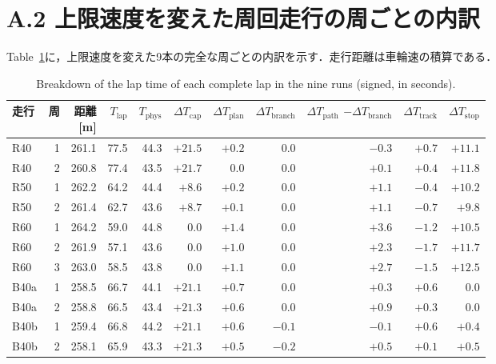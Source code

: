 \section*{A.2 上限速度を変えた周回走行の周ごとの内訳}
\label{sec:app_laps_1119}
Table~\ref{tab:decomp_laps_1119}に，上限速度を変えた9本の完全な周ごとの内訳を示す．走行距離は車輪速の積算である．

\begin{table}[!htbp]
  \centering
  \caption{Breakdown of the lap time of each complete lap in the nine runs (signed, in seconds).}
  \label{tab:decomp_laps_1119}
  \footnotesize
  \begin{lrbox}{\tblbox}\setlength{\tabcolsep}{3pt}\begin{tabular}{lrrrrrrrrrr}
    \toprule
    走行 & 周 & \shortstack[r]{距離\\{[m]}} & $T_{\mathrm{lap}}$ & $T_{\mathrm{phys}}$ & $\Delta T_{\mathrm{cap}}$ & $\Delta T_{\mathrm{plan}}$ & $\Delta T_{\mathrm{branch}}$ & \shortstack[r]{$\Delta T_{\mathrm{path}}$\\$-\Delta T_{\mathrm{branch}}$} & $\Delta T_{\mathrm{track}}$ & $\Delta T_{\mathrm{stop}}$ \\
    \midrule
    R40 & 1 & 261.1 & 77.5 & 44.3 & $+21.5$ & $+0.2$ & 0.0 & $-0.3$ & $+0.7$ & $+11.1$ \\
    R40 & 2 & 260.8 & 77.4 & 43.5 & $+21.7$ & 0.0 & 0.0 & $+0.1$ & $+0.4$ & $+11.8$ \\
    R50 & 1 & 262.2 & 64.2 & 44.4 & $+8.6$ & $+0.2$ & 0.0 & $+1.1$ & $-0.4$ & $+10.2$ \\
    R50 & 2 & 261.4 & 62.7 & 43.6 & $+8.7$ & $+0.1$ & 0.0 & $+1.1$ & $-0.7$ & $+9.8$ \\
    R60 & 1 & 264.2 & 59.0 & 44.8 & 0.0 & $+1.4$ & 0.0 & $+3.6$ & $-1.2$ & $+10.5$ \\
    R60 & 2 & 261.9 & 57.1 & 43.6 & 0.0 & $+1.0$ & 0.0 & $+2.3$ & $-1.7$ & $+11.7$ \\
    R60 & 3 & 263.0 & 58.5 & 43.8 & 0.0 & $+1.1$ & 0.0 & $+2.7$ & $-1.5$ & $+12.5$ \\
    B40a & 1 & 258.5 & 66.7 & 44.1 & $+21.1$ & $+0.7$ & 0.0 & $+0.3$ & $+0.6$ & 0.0 \\
    B40a & 2 & 258.8 & 66.5 & 43.4 & $+21.3$ & $+0.6$ & 0.0 & $+0.9$ & $+0.3$ & 0.0 \\
    B40b & 1 & 259.4 & 66.8 & 44.2 & $+21.1$ & $+0.6$ & $-0.1$ & $-0.1$ & $+0.6$ & $+0.4$ \\
    B40b & 2 & 258.1 & 65.9 & 43.3 & $+21.3$ & $+0.5$ & $-0.2$ & $+0.5$ & $+0.1$ & $+0.5$ \\

\end{tabular}
\end{lrbox}
\end{table}
